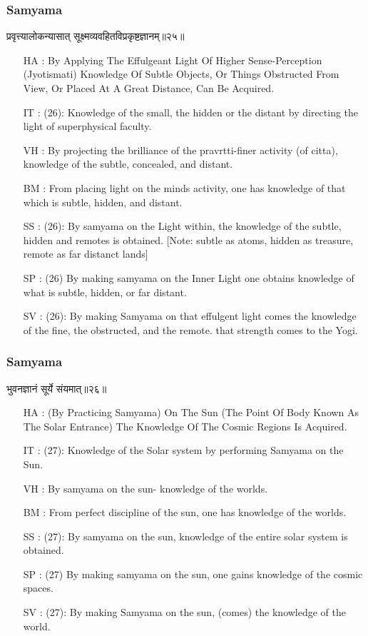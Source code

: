 \begin{frame}[fragile]\frametitle{Samyama}
\begin{sanskrit}
प्रवृत्त्यालोकन्यासात् सूक्ष्मव्यवहितविप्रकृष्टज्ञानम्॥२५॥
\end{sanskrit}

	\begin{itemize}
	\item [HA]: By Applying The Effulgeant Light Of Higher Sense-Perception (Jyotismati) Knowledge Of Subtle Objects, Or Things Obstructed From View, Or Placed At A Great Distance, Can Be Acquired.
	\item [IT]: (26): Knowledge of the small, the hidden or the distant by directing the light of superphysical faculty.
	\item [VH]: By projecting the brilliance of the pravrtti-finer activity (of citta), knowledge of the subtle, concealed, and distant.
	\item [BM]: From placing light on the minds activity, one has knowledge of that which is subtle, hidden, and distant.
	\item [SS]: (26): By samyama on the Light within, the knowledge of the subtle, hidden and remotes is obtained. [Note: subtle as atoms, hidden as treasure, remote as far distanct lands]
	\item [SP]: (26) By making samyama on the Inner Light one obtains knowledge of what is subtle, hidden, or far distant.
	\item [SV]: (26): By making Samyama on that effulgent light comes the knowledge of the fine, the obstructed, and the remote. that strength comes to the Yogi. 
	\end{itemize}
	
\end{frame}

\begin{frame}[fragile]\frametitle{Samyama}
\begin{sanskrit}
भुवनज्ञानं सूर्ये संयमात्॥२६॥
\end{sanskrit}

	\begin{itemize}
	\item [HA]: (By Practicing Samyama) On The Sun (The Point Of Body Known As The Solar Entrance) The Knowledge Of The Cosmic Regions Is Acquired.
	\item [IT]: (27): Knowledge of the Solar system by performing Samyama on the Sun.
	\item [VH]: By samyama on the sun- knowledge of the worlds.
	\item [BM]: From perfect discipline of the sun, one has knowledge of the worlds.
	\item [SS]: (27): By samyama on the sun, knowledge of the entire solar system is obtained.
	\item [SP]: (27) By making samyama on the sun, one gains knowledge of the cosmic spaces.
	\item [SV]: (27): By making Samyama on the sun, (comes) the knowledge of the world. 
	\end{itemize}
\end{frame}

